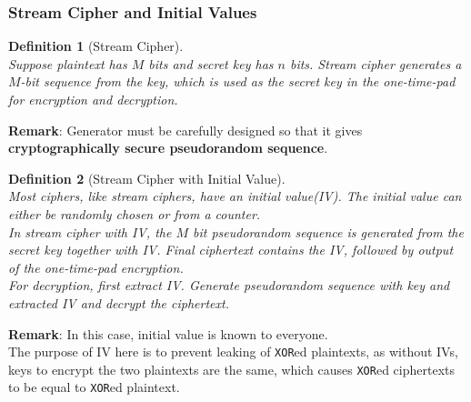 \documentclass[12pt]{article}
\newtheorem{definition}{Definition}[section]
\theoremstyle{definition}
\begin{document}
\subsubsection{Stream Cipher and Initial Values}
\begin{definition}[Stream Cipher]
\hfill\\\normalfont Suppose plaintext has $M$ bits and secret key has $n$ bits. Stream cipher generates a $M$-bit sequence from the key, which is used as the secret key in the one-time-pad for encryption and decryption.
\end{definition}
\textbf{Remark}: Generator must be carefully designed so that it gives \textbf{cryptographically secure pseudorandom sequence}.
\begin{definition}[Stream Cipher with Initial Value]
\hfill\\\normalfont Most ciphers, like stream ciphers, have an initial value(IV). The initial value can either be randomly chosen or from a counter.\\
In stream cipher with IV, the $M$ bit pseudorandom sequence is generated from the secret key \textit{together} with IV. Final ciphertext contains the IV, \textit{followed by} output of the one-time-pad encryption.\\
For decryption, first extract IV. Generate pseudorandom sequence with key and extracted IV and decrypt the ciphertext.
\end{definition} 
\textbf{Remark}: In this case, initial value is known to everyone.\\
The purpose of IV here is to prevent leaking of \texttt{XOR}ed plaintexts, as without IVs, keys to encrypt the two plaintexts are the same, which causes \texttt{XOR}ed ciphertexts to be equal to \texttt{XOR}ed plaintext.
\end{document}
